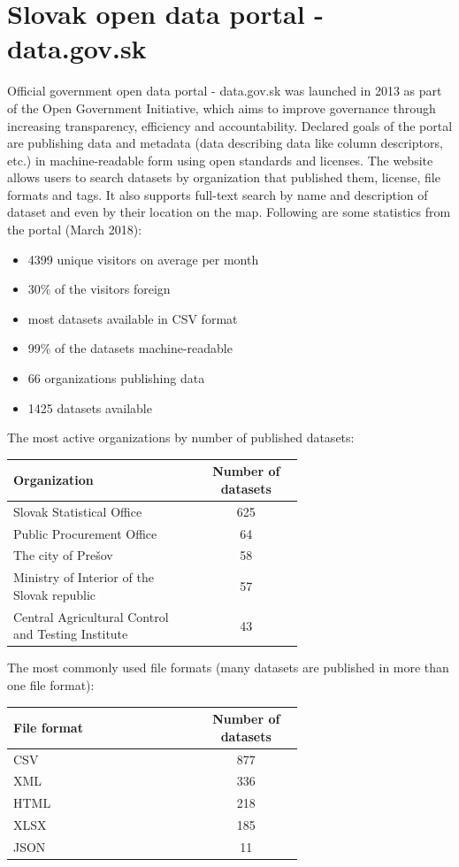 \documentclass[thesis=B,english]{FITthesis}[2012/06/26]
\begin{document}
	\section{Slovak open data portal - data.gov.sk}
	Official government open data portal - data.gov.sk was launched in 2013 as part of the Open Government Initiative, which aims to improve governance through increasing transparency, efficiency and accountability. Declared goals of the portal are publishing data and metadata (data describing data like column descriptors, etc.) in machine-readable form using open standards and licenses. The website allows users to search datasets by organization that published them, license, file formats and tags. It also supports full-text search by name and description of dataset and even by their location on the map.
	Following are some statistics from the portal (March 2018):
	\begin{itemize}
		\item 4399 unique visitors on average per month
		\item 30\% of the visitors foreign 
		\item most datasets available in CSV format
		\item  99\% of the datasets machine-readable
		\item 66 organizations publishing data
		\item 1425 datasets available
	\end{itemize}
	The most active organizations by number of published datasets:
	\begin{center}
	\label{toporganizations}
        \begin{tabular}{  p{0.65\linewidth} | c }
        \textbf{Organization} & \textbf{Number of datasets} \\ \hline
        Slovak Statistical Office & 625 \\
        Public Procurement Office & 64 \\
        The city of Prešov & 58 \\
        Ministry of Interior of the Slovak republic & 57 \\
        Central Agricultural Control and Testing Institute & 43 \\
        \end{tabular}
    \end{center}
    \vspace{20px}
    The most commonly used file formats (many datasets are published in more than one file format):
    \begin{center}
        \begin{tabular}{  p{0.65\linewidth} | c }
        \textbf{File format} & \textbf{Number of datasets} \\ \hline
        CSV & 877 \\
        XML & 336 \\
        HTML & 218 \\
        XLSX & 185 \\
        JSON & 11 \\
        \end{tabular}
    \end{center}
\end{document}
